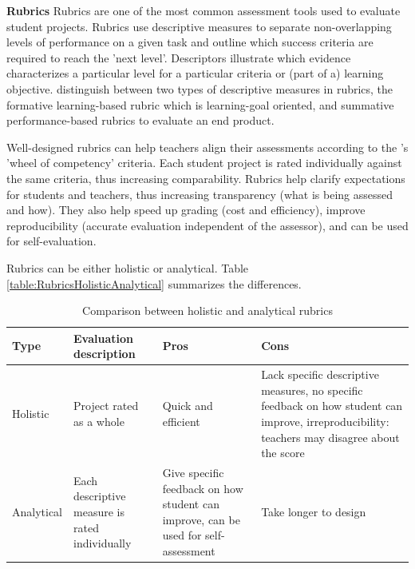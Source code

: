 \noindent \textbf{Rubrics} \newline
Rubrics are one of the most common assessment tools used to evaluate student projects. Rubrics use descriptive measures to separate non-overlapping levels of performance on a given task and outline which success criteria are required to reach the 'next level'.  Descriptors illustrate which evidence characterizes a particular level for a particular criteria or (part of a) learning objective.  distinguish between two types of descriptive measures in rubrics, the formative learning-based rubric which is learning-goal oriented, and summative performance-based rubrics to evaluate an end product.

Well-designed rubrics can help teachers align their assessments according to the \citeauthor{baartman2006wheel}'s 'wheel of competency' criteria. Each student project is rated individually against the same criteria, thus increasing comparability. Rubrics help clarify expectations for students and teachers, thus increasing transparency (what is being assessed and how). They also help speed up grading \cite{catete2017framework} (cost and efficiency), improve reproducibility (accurate evaluation independent of the assessor), and can be used for self-evaluation.


Rubrics can be either holistic or analytical. Table \ref{table:RubricsHolisticAnalytical} summarizes the differences.

\begin{table}
  \centering
\begin{tabular}{|l||p{20mm}|p{55mm}|p{65mm}|}
  \hline
  \textbf{Type} & \textbf{Evaluation description} & \textbf{Pros} & \textbf{Cons} \\
  \hline
  Holistic & Project rated as a whole & Quick and efficient & Lack specific descriptive measures, no specific feedback on how student can improve, irreproducibility: teachers may disagree about the score \cite{catete2017framework} \\ \hline
  Analytical & Each descriptive measure is rated individually & Give specific feedback on how student can improve, can be used for self-assessment & Take longer to design \\
  \hline
\end{tabular}
\caption{Comparison between holistic and analytical rubrics}
\end{table}\label{table:RubricsHolisticAnalytical}



